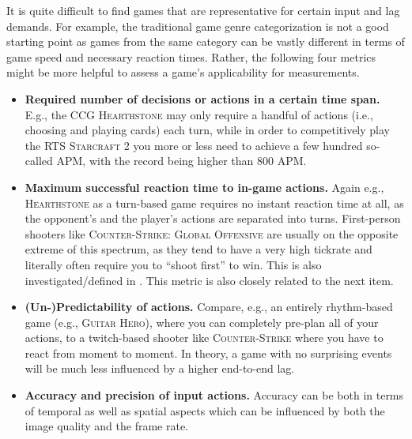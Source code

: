 It is quite difficult to find games that are representative for certain input and lag demands. For example, the traditional game genre categorization is not a good starting point as games from the same category can be vastly different in terms of game speed and necessary reaction times. Rather, the following four metrics might be more helpful to assess a game's applicability for measurements.

 \begin{itemize}
    \item \textbf{Required number of decisions or actions in a certain time span.} E.g., the \gls{CCG} \textsc{Hearthstone} may only require a handful of actions (i.e., choosing and playing cards) each turn, while in order to competitively play the \gls{RTS} \textsc{Starcraft 2} you more or less need to achieve a few hundred so-called \gls{APM}, with the record being higher than $800$ \gls{APM}.%

    \item \textbf{Maximum successful reaction time to in-game actions.} Again e.g., \textsc{Hearthstone} as a turn-based game requires no instant reaction time at all, as the opponent's and the player's actions are separated into turns. First-person shooters like \textsc{Counter-Strike: Global Offensive} are usually on the opposite extreme of this spectrum, as they tend to have a very high tickrate and literally often require you to ``shoot first'' to win. This is also investigated/defined in \cite{Claypool:2006:LPA:1167838.1167860}. This metric is also closely related to the next item.

    \item \textbf{(Un-)Predictability of actions.} Compare, e.g., an entirely rhythm-based game (e.g., \textsc{Guitar Hero}), where you can completely pre-plan all of your actions, to a twitch-based shooter like \textsc{Counter-Strike} where you have to react from moment to moment. In theory, a game with no surprising events will be much less influenced by a higher end-to-end lag.

    \item \textbf{Accuracy and precision of input actions.} Accuracy can be both in terms of temporal as well as spatial aspects which can be influenced by both the image quality and the frame rate.  %

\end{itemize}
